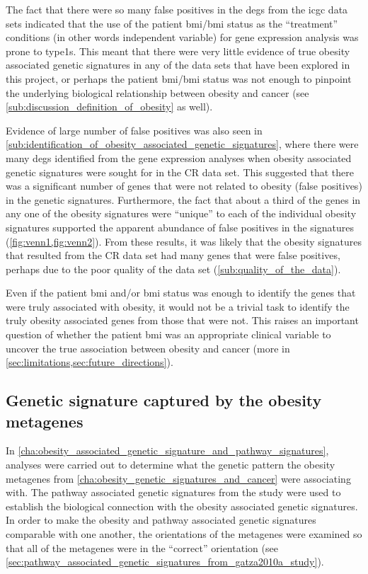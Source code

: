 The fact that there were so many false positives in the \glspl{deg} from the \gls{icgc} data sets indicated that the use of the patient \gls{bmi}/\gls{bmi} status as the ``treatment'' conditions (in other words independent variable) for gene expression analysis was prone to \Glspl{type1}.
This meant that there were very little evidence of true obesity associated genetic signatures in any of the data sets that have been explored in this project, or perhaps the patient \gls{bmi}/\gls{bmi} status was not enough to pinpoint the underlying biological relationship between obesity and cancer (see \cref{sub:discussion_definition_of_obesity} as well).

Evidence of large number of false positives was also seen in \cref{sub:identification_of_obesity_associated_genetic_signatures}, where there were many \glspl{deg} identified from the gene expression analyses when obesity associated genetic signatures were sought for in the CR data set.
This suggested that there was a significant number of genes that were not related to obesity (false positives) in the genetic signatures.
Furthermore, the fact that about a third of the genes in any one of the obesity signatures were ``unique'' to each of the individual obesity signatures supported the apparent abundance of false positives in the signatures (\cref{fig:venn1,fig:venn2}).
From these results, it was likely that the obesity signatures that resulted from the CR data set had many genes that were false positives, perhaps due to the poor quality of the data set (\cref{sub:quality_of_the_data}).

Even if the patient \gls{bmi} and/or \gls{bmi} status was enough to identify the genes that were truly associated with obesity, it would not be a trivial task to identify the truly obesity associated genes from those that were not.
This raises an important question of whether the patient \gls{bmi} was an appropriate clinical variable to uncover the true association between obesity and cancer (more in \cref{sec:limitations,sec:future_directions}).

\subsection{Genetic signature captured by the obesity metagenes}
\label{sub:genetic_signature_captured_by_the_obesity_metagenes}

In \cref{cha:obesity_associated_genetic_signature_and_pathway_signatures}, analyses were carried out to determine what the genetic pattern the obesity metagenes from \cref{cha:obesity_genetic_signatures_and_cancer} were associating with.
The pathway associated genetic signatures from the \citet{Gatza2010a} study were used to establish the biological connection with the obesity associated genetic signatures.
In order to make the obesity and pathway associated genetic signatures comparable with one another, the orientations of the metagenes were examined so that all of the metagenes were in the ``correct'' orientation (see \cref{sec:pathway_associated_genetic_signatures_from_gatza2010a_study}).

